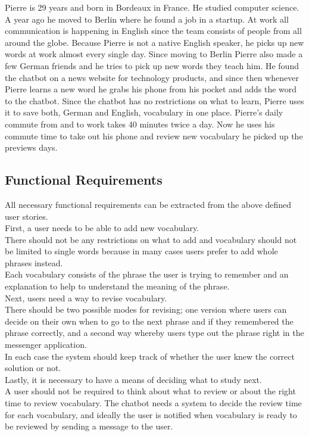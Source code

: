 Pierre is 29 years and born in Bordeaux in France.
He studied computer science.
A year ago he moved to Berlin where he found a job in a startup.
At work all communication is happening in English since the team consists of people from all around the globe.
Because Pierre is not a native English speaker, he picks up new words at work almost every single day.
Since moving to Berlin Pierre also made a few German friends and he tries to pick up new words they teach him.
He found the chatbot on a news website for technology products,
and since then whenever Pierre learns a new word he grabs his phone from his pocket and adds the word to the chatbot.
Since the chatbot has no restrictions on what to learn, Pierre uses it to save both, German and English, vocabulary in one place.
Pierre's daily commute from and to work takes 40 minutes twice a day.
Now he uses his commute time to take out his phone and review new vocabulary he picked up the previews days.
\\


\subsection{Functional Requirements}
\label{funcreq}

All necessary functional requirements can be extracted from the above defined user stories.
\\

First, a user needs to be able to add new vocabulary.
\\
There should not be any restrictions on what to add
and vocabulary should not be limited to single words because in many cases users prefer
to add whole phrases instead.
\\
Each vocabulary consists of the phrase the user is trying to remember
and an explanation to help to understand the meaning of the phrase.
\\

Next, users need a way to revise vocabulary.
\\
There should be two possible modes for revising;
one version where users can decide on their own when to go to the next phrase
and if they remembered the phrase correctly,
and a second way whereby users type out the phrase right in the messenger application.
\\
In each case the system should keep track of whether the user knew the correct solution or not.
\\

Lastly, it is necessary to have a means of deciding what to study next.
\\
A user should not be required to think about what to review or about the right time to review vocabulary.
The chatbot needs a system to decide the review time for each vocabulary,
and ideally the user is notified when vocabulary is ready to be reviewed by sending a message to the user.
\\

